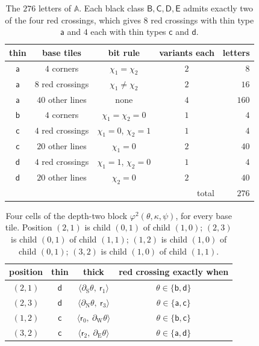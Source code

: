 \begin{table}[ht]
\centering
\begin{tabular}{c|c|c|c|r}
thin & base tiles & bit rule & variants each & letters\\\hline
$\mathsf a$ & $4$ corners & $\chi_1=\chi_2$ & $2$ & $8$\\
$\mathsf a$ & $8$ red crossings & $\chi_1\ne\chi_2$ & $2$ & $16$\\
$\mathsf a$ & $40$ other lines & none & $4$ & $160$\\
$\mathsf b$ & $4$ corners & $\chi_1=\chi_2=0$ & $1$ & $4$\\
$\mathsf c$ & $4$ red crossings & $\chi_1=0$, $\chi_2=1$ & $1$ & $4$\\
$\mathsf c$ & $20$ other lines & $\chi_1=0$ & $2$ & $40$\\
$\mathsf d$ & $4$ red crossings & $\chi_1=1$, $\chi_2=0$ & $1$ & $4$\\
$\mathsf d$ & $20$ other lines & $\chi_2=0$ & $2$ & $40$\\\hline
\multicolumn{4}{r|}{total} & $276$
\end{tabular}
\caption{The $276$ letters of $\mathbb A$. Each black class $\mathsf B,\mathsf C,\mathsf D,\mathsf E$ admits exactly two of the four red crossings, which gives $8$ red crossings with thin type $\mathsf a$ and $4$ each with thin types $\mathsf c$ and $\mathsf d$.}
\label{tab:letters}
\end{table}

\begin{table}[ht]
\centering
\begin{tabular}{c|c|c|c}
position & thin & thick & red crossing exactly when\\\hline
$(2,1)$ & $\mathsf d$ & $\langle\partial_{\mathrm S}\theta,\ \mathsf r_1\rangle$ & $\theta\in\{\mathsf b,\mathsf d\}$\\
$(2,3)$ & $\mathsf d$ & $\langle\partial_{\mathrm N}\theta,\ \mathsf r_3\rangle$ & $\theta\in\{\mathsf a,\mathsf c\}$\\
$(1,2)$ & $\mathsf c$ & $\langle\mathsf r_0,\ \partial_{\mathrm W}\theta\rangle$ & $\theta\in\{\mathsf b,\mathsf c\}$\\
$(3,2)$ & $\mathsf c$ & $\langle\mathsf r_2,\ \partial_{\mathrm E}\theta\rangle$ & $\theta\in\{\mathsf a,\mathsf d\}$
\end{tabular}
\caption{Four cells of the depth-two block $\varphi^2(\theta,\kappa,\psi)$, for every base tile. Position $(2,1)$ is child $(0,1)$ of child $(1,0)$; $(2,3)$ is child $(0,1)$ of child $(1,1)$; $(1,2)$ is child $(1,0)$ of child $(0,1)$; $(3,2)$ is child $(1,0)$ of child $(1,1)$.}
\label{tab:witness}
\end{table}

